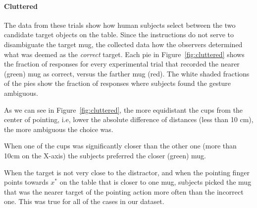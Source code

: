 \paragraph{Cluttered}
The data from these trials show how human subjects select between the two candidate target objects on the table. Since the instructions do not serve to disambiguate the target mug, the collected data how the observers determined what was deemed as the \textit{correct} target. 
Each pie in Figure~\ref{fig:cluttered} shows the fraction of responses for every experimental trial that recorded the nearer (green) mug as correct, versus the farther mug (red). The white shaded fractions of the pies show the fraction of responses where subjects found the gesture ambiguous.

As we can see in Figure~\ref{fig:cluttered}, the more equidistant the cups from the center of pointing, i.e, lower the absolute difference of distances (less than 10 cm), the more {ambiguous} the choice was. 

When one of the cups was significantly closer than the other one (more than 10cm on the X-axis) the subjects preferred the closer (green) mug.

When the target is not very close to the distractor, and when the pointing finger points towards $x^*$ on the table that is closer to one mug, subjects picked the mug that was the nearer target of the pointing action more often than the incorrect one. This was true for all of the cases in our dataset. 


